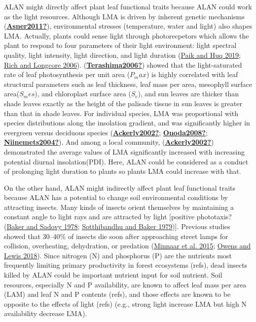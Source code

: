 \documentclass[
]{article}
\begin{document}
ALAN might directly affect plant leaf functional traits because ALAN
could work as the light resources. Although LMA is driven by inherent
genetic mechanisms
(\protect\hyperlink{ref-Asner2011}{\textbf{Asner2011?}}), environmental
stresses (temperature, water and light) also shapes LMA. Actually,
plants could sense light through photorecpetors which allows the plant
to respond to four parameters of their light environment: light spectral
quality, light intensity, light direction, and light duration
(\protect\hyperlink{ref-Paik2019}{Paik and Huq 2019};
\protect\hyperlink{ref-Rich2006}{Rich and Longcore 2006}).
(\protect\hyperlink{ref-Terashima2006}{\textbf{Terashima2006?}}) showed
that the light-saturated rate of leaf photosynthesis per unit area
(\(P_max\)) is highly correlated with leaf structural parameters such as
leaf thickness, leaf mass per area, mesophyll surface area(\(S_mes\)),
and chloroplast surface area (\(S_c\)), and sun leaves are thicker than
shade leaves exactly as the height of the palisade tissue in sun leaves
is greater than that in shade leaves. For individual species, LMA was
proportional with species distributions along the insolation gradient,
and was significantly higher in evergreen versus deciduous species
(\protect\hyperlink{ref-Ackerly2002}{\textbf{Ackerly2002?}};
\protect\hyperlink{ref-Onoda2008}{\textbf{Onoda2008?}};
\protect\hyperlink{ref-Niinemets2004}{\textbf{Niinemets2004?}}). And
among a local community,
(\protect\hyperlink{ref-Ackerly2002}{\textbf{Ackerly2002?}})
demonstrated the average values of LMA significantly increased with
increasing potential diurnal insolation(PDI). Here, ALAN could be
considered as a conduct of prolonging light duration to plants so plants
LMA could increase with that.

On the other hand, ALAN might indirectly affect plant leaf functional
traits because ALAN has a potential to change soil environmental
conditions by attracting insects. Many kinds of insects orient
themselves by maintaining a constant angle to light rays and are
attracted by light {[}positive phototaxis?
(\protect\hyperlink{ref-Baker1978}{Baker and Sadovy 1978};
\protect\hyperlink{ref-Sotthibandhu1979}{Sotthibandhu and Baker
1979}){]}. Previous studies showed that 30--40\% of insects die soon
after approaching street lamps for collision, overheating, dehydration,
or predation (\protect\hyperlink{ref-Minnaar2015}{Minnaar et al. 2015};
\protect\hyperlink{ref-Owens2018}{Owens and Lewis 2018}). Since nitrogen
(N) and phosphorus (P) are the nutrients most frequently limiting
primary productivity in forest ecosystems (refs), dead insects killed by
ALAN could be important nutrient input for soil nutrient. Soil
resources, especially N and P availability, are known to affect leaf
mass per area (LAM) and leaf N and P contents (refs), and those effects
are known to be opposite to the effects of light (refs) (e.g., strong
light increase LMA but high N availability decrease LMA).
\end{document}
